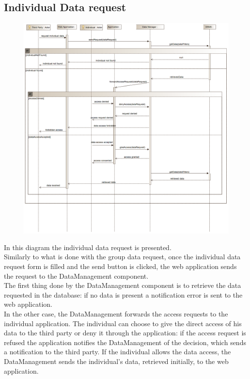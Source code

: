 \subsection{Individual Data request}
\begin{figure}[H]
\centering
\includegraphics[width=\linewidth]{resources/uml/sequence/RequestIndividualData.png}
\end{figure}
In this diagram the individual data request is presented.\\
Similarly to what is done with the group data request, once the individual data request form is filled and the send button is clicked, the web application sends the request to the DataManagement component.\\
The first thing done by the DataManagement component is to retrieve the data requested in the database: if no data is present a notification error is sent to the web application.\\
In the other case, the DataManagement forwards the access requests to the individual application.
The individual can choose to give the direct access of his data to the third party or deny it through the application: if the access request is refused the application notifies the DataManagement of the decision, which sends a notification to the third party.
If the individual allows the data access, the DataManagement sends the individual's data, retrieved initially, to the web application.


